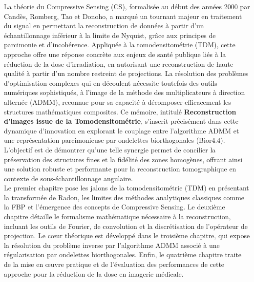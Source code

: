 La théorie du Compressive Sensing (CS), formalisée au début des années 2000 par Candès, Romberg, Tao et Donoho, a marqué un tournant majeur en traitement du signal en permettant la reconstruction de données à partir d'un échantillonnage inférieur à la limite de Nyquist, grâce aux principes de parcimonie et d'incohérence. Appliquée à la tomodensitométrie (TDM), cette approche offre une réponse concrète aux enjeux de santé publique liés à la réduction de la dose d’irradiation, en autorisant une reconstruction de haute qualité à partir d'un nombre restreint de projections. La résolution des problèmes d'optimisation complexes qui en découlent nécessite toutefois des outils numériques sophistiqués, à l'image de la méthode des multiplicateurs à direction alternée (ADMM), reconnue pour sa capacité à décomposer efficacement les structures mathématiques composites. Ce mémoire, intitulé \textbf{Reconstruction d'images issue de la Tomodensitométrie}, s'inscrit précisément dans cette dynamique d'innovation en explorant le couplage entre l'algorithme ADMM et une représentation parcimonieuse par ondelettes biorthogonales (Bior4.4). L'objectif est de démontrer qu'une telle synergie permet de concilier la préservation des structures fines et la fidélité des zones homogènes, offrant ainsi une solution robuste et performante pour la reconstruction tomographique en contexte de sous-échantillonnage angulaire.\\

Le premier chapitre pose les jalons de la tomodensitométrie (TDM) en présentant la transformée de Radon, les limites des méthodes analytiques classiques comme la FBP et l'émergence des concepts de Compressive Sensing. Le deuxième chapitre détaille le formalisme mathématique nécessaire à la reconstruction, incluant les outils de Fourier, de convolution et la discrétisation de l'opérateur de projection. Le cœur théorique est développé dans le troisième chapitre, qui expose la résolution du problème inverse par l'algorithme ADMM associé à une régularisation par ondelettes biorthogonales. Enfin, le quatrième chapitre traite de la mise en œuvre pratique et de l'évaluation des performances de cette approche pour la réduction de la dose en imagerie médicale.
